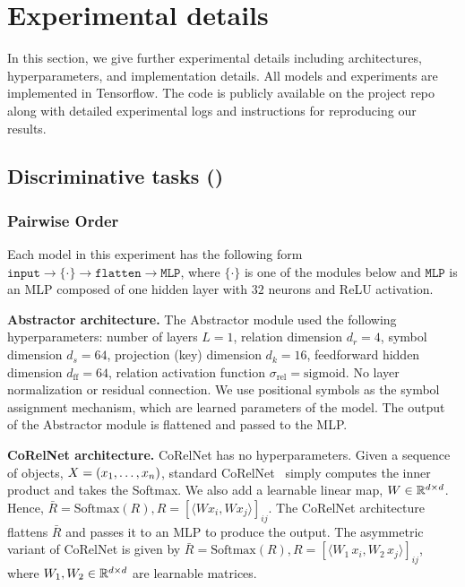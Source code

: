 \section{Experimental details}\label{sec:experimental_details}

In this section, we give further experimental details including architectures, hyperparameters, and implementation details. All models and experiments are implemented in Tensorflow. The code is publicly available on the project repo along with detailed experimental logs and instructions for reproducing our results.

\subsection{Discriminative tasks ()}


\subsubsection{Pairwise Order}
Each model in this experiment has the following form $\texttt{input} \to \{ \cdot \} \to \texttt{flatten} \to \texttt{MLP}$, where $\{\cdot\}$ is one of the modules below and $\texttt{MLP}$ is an MLP composed of one hidden layer with $32$ neurons and ReLU activation.

\textbf{Abstractor architecture.} The Abstractor module used the following hyperparameters: number of layers $L = 1$, relation dimension $d_r = 4$, symbol dimension $d_s = 64$, projection (key) dimension $d_k = 16$, feedforward hidden dimension $d_{\mathrm{ff}} = 64$, relation activation function $\sigma_{\mathrm{rel}} = \mathrm{sigmoid}$. No layer normalization or residual connection. We use positional symbols as the symbol assignment mechanism, which are learned parameters of the model. The output of the Abstractor module is flattened and passed to the MLP.

\textbf{CoRelNet architecture.} CoRelNet has no hyperparameters. Given a sequence of objects, $X = (x_1, \ldots, x_n)$, standard CoRelNet~\citep{kerg2022neural} simply computes the inner product and takes the Softmax. We also add a learnable linear map, $W \in \mathbb{R}^{d \times d}$. Hence, $\bar{R} = \text{Softmax}(R), R = {\left[\langle W x_i, W x_j\rangle\right]}_{ij}$. The CoRelNet architecture flattens $\bar{R}$ and passes it to an MLP to produce the output. The asymmetric variant of CoRelNet is given by $\bar{R} = \text{Softmax}(R), R = {\left[\langle W_1\, x_i, W_2\, x_j\rangle\right]}_{ij}$, where $W_1, W_2 \in \mathbb{R}^{d \times d}$ are learnable matrices.

